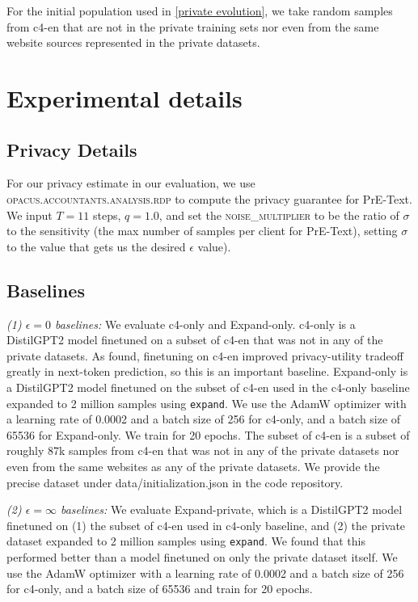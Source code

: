 \documentclass{article}
\theoremstyle{plain}
\theoremstyle{definition}
\theoremstyle{remark}
\begin{document}
For the initial population used in \cref{private evolution}, we take random samples from c4-en that are not in the private training sets nor even from the same website sources represented in the private datasets.

\section{Experimental details}

\subsection{Privacy Details}
\label{app:privacy}
For our privacy estimate in our evaluation, we use \textsc{opacus.accountants.analysis.rdp} to compute the privacy guarantee for PrE-Text. We input $T=11$ steps, $q=1.0$, and set the \textsc{noise\_multiplier} to be the ratio of $\sigma$ to the sensitivity (the max number of samples per client for PrE-Text), setting $\sigma$ to the value that gets us the desired $\epsilon$ value).

\subsection{Baselines}
\label{app:exp details}
\textit{(1) $\epsilon=0$ baselines:} We evaluate c4-only and Expand-only. c4-only is a DistilGPT2 model finetuned on a subset of c4-en that was not in any of the private datasets. As \citet{xu2023federated} found, finetuning on c4-en improved privacy-utility tradeoff greatly in next-token prediction, so this is an important baseline. Expand-only is a DistilGPT2 model finetuned on the subset of c4-en used in the c4-only baseline expanded to 2 million samples using \texttt{expand}. We use the AdamW optimizer with a learning rate of 0.0002 and a batch size of 256 for c4-only, and a batch size of 65536 for Expand-only. We train for 20 epochs. The subset of c4-en is a subset of roughly 87k samples from c4-en that was not in any of the private datasets nor even from the same websites as any of the private datasets. We provide the precise dataset under data/initialization.json in the code repository.

\textit{(2) $\epsilon=\infty$ baselines:} We evaluate Expand-private, which is a DistilGPT2 model finetuned on (1) the subset of c4-en used in c4-only baseline, and (2) the private dataset expanded to 2 million samples using \texttt{expand}. We found that this performed better than a model finetuned on only the private dataset itself.  We use the AdamW optimizer with a learning rate of 0.0002 and a batch size of 256 for c4-only, and a batch size of 65536 and train for 20 epochs.
\end{document}
